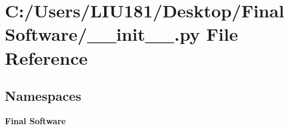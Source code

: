 \section{C\+:/\+Users/\+L\+I\+U181/\+Desktop/\+Final Software/\+\_\+\+\_\+init\+\_\+\+\_\+.py File Reference}
\label{____init_____8py}
\subsection*{Namespaces}
\begin{DoxyCompactItemize}
\item 
 \textbf{ Final Software}
\end{DoxyCompactItemize}
